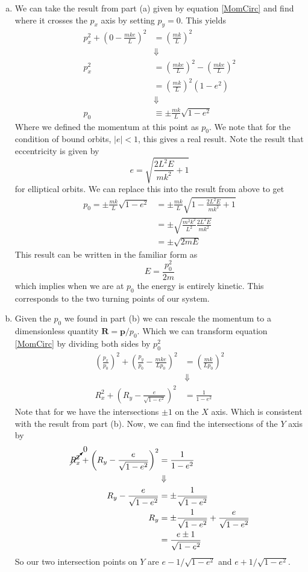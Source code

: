 \documentclass[11pt]{article}
\numberwithin{equation}{section}
\begin{document}
\begin{enumerate}[(a)]
\item
We can take the result from part (a) given by equation \ref{MomCirc} and find where it 
crosses the $p_x$ axis by setting $p_y=0$. This yields
\begin{align*}
p_x^2 + \left(0 - \frac{mke}{L}\right)^2 &= \left(\frac{mk}{L}\right)^2\\
&\Downarrow\\
p_x^2 &= \left(\frac{mke}{L}\right)^2 - \left(\frac{mke}{L}\right)^2\\
&= \left(\frac{mk}{L}\right)^2\left(1-e^2\right)\\
&\Downarrow\\
p_0 &\equiv \pm\frac{mk}{L}\sqrt{1-e^2}
\end{align*}
Where we defined the momentum at this point as $p_0$. We note that for the condition of bound orbits, $|e|<1$, this gives a real result. Note the 
result that eccentricity is given by
\begin{equation}
e = \sqrt{\frac{2L^2E}{mk^2}+1}
\label{eccen}
\end{equation}
for elliptical orbits. We can replace this into the result from above to get
\begin{align*}
p_0 = \pm\frac{mk}{L}\sqrt{1-e^2} &= \pm\frac{mk}{L}\sqrt{1-\frac{2L^2E}{mk^2}+1} \\
&= \pm\sqrt{\frac{m^2k^2}{L^2}\frac{2L^2E}{mk^2}} \\
&= \pm\sqrt{2mE}
\end{align*}
This result can be written in the familiar form as 
$$E = \frac{p_0^2}{2m}$$
which implies when we are at $p_0$ the energy is entirely kinetic. This corresponds to the 
two turning points of our system.

\item
Given the $p_0$ we found in part (b) we can rescale the momentum to a dimensionless quantity
$\mathbf{R} = \mathbf{p}/p_0$. Which we can transform equation \ref{MomCirc} by dividing 
both sides by $p_0^2$
\begin{align*}
\left(\frac{p_x}{p_0}\right)^2 + \left(\frac{p_y}{p_0} - \frac{mke}{Lp_0}\right)^2 &= \left(\frac{mk}{Lp_0}\right)^2\\
&\Downarrow\\
R_x^2 + \left(R_y - \frac{e}{\sqrt{1-e^2}}\right)^2 &= \frac{1}{1-e^2}
\end{align*}
Note that for we have the intersections $\pm1$ on the $X$ axis. Which is consistent with 
the result from part (b). Now, we can find the intersections of the $Y$ axis by
\begin{align*}
\cancelto{0}{R_x^2} + \left(R_y - \frac{e}{\sqrt{1-e^2}}\right)^2 &= \frac{1}{1-e^2}\\
&\Downarrow\\
R_y - \frac{e}{\sqrt{1-e^2}} &= \pm\frac{1}{\sqrt{1-e^2}}\\
R_y &= \pm\frac{1}{\sqrt{1-e^2}} + \frac{e}{\sqrt{1-e^2}} \\
&= \frac{e\pm1}{\sqrt{1-e^2}}
\end{align*}
So our two intersection points on $Y$ are $e-1/\sqrt{1-e^2}$ and $e+1/\sqrt{1-e^2}$.


\end{enumerate}
\end{document}
